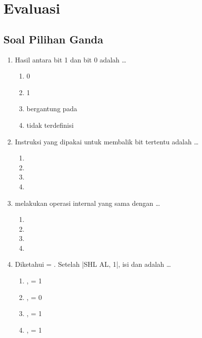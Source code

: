 \section{Evaluasi}
\label{sec:evaluasi-bab11}

\subsection{Soal Pilihan Ganda}

\begin{enumerate}
    \item Hasil  antara bit 1 dan bit 0 adalah \dots
          \begin{enumerate}
              \item 0 \item 1
              \item bergantung pada 
              \item tidak terdefinisi
          \end{enumerate}

    \item Instruksi yang dipakai untuk membalik bit tertentu
          adalah \dots
          \begin{enumerate}
              \item {} \item {}
              \item {} \item {}
          \end{enumerate}

    \item {} melakukan operasi internal yang sama dengan
          \dots
          \begin{enumerate}
              \item {} \item {}
              \item {} \item {}
          \end{enumerate}

    \item Diketahui  = . Setelah
          \lstasm|SHL AL, 1|, isi  dan  adalah
          \dots
          \begin{enumerate}
              \item {},  = 1
              \item {},  = 0
              \item {},  = 1
              \item {},  = 1
          \end{enumerate}


\end{enumerate}
